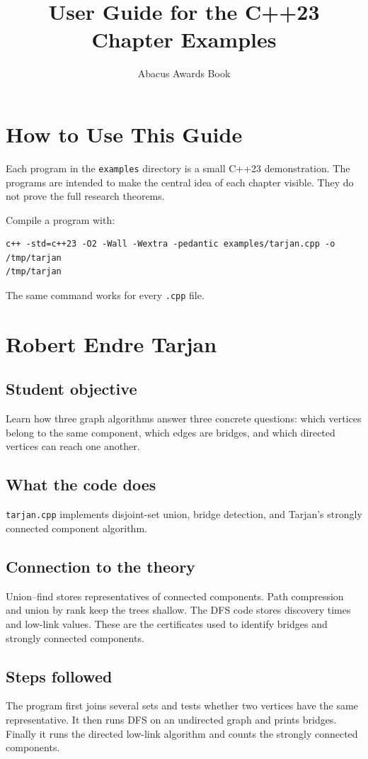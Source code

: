\documentclass[11pt]{book}
\title{User Guide for the C++23 Chapter Examples}
\author{Abacus Awards Book}
\begin{document}
\maketitle
\tableofcontents

\chapter*{How to Use This Guide}
Each program in the \texttt{examples} directory is a small C++23 demonstration.
The programs are intended to make the central idea of each chapter visible.
They do not prove the full research theorems.

Compile a program with:
\begin{verbatim}
c++ -std=c++23 -O2 -Wall -Wextra -pedantic examples/tarjan.cpp -o /tmp/tarjan
/tmp/tarjan
\end{verbatim}

The same command works for every \texttt{.cpp} file.

\chapter{Robert Endre Tarjan}
\section{Student objective}
Learn how three graph algorithms answer three concrete questions: which vertices belong to the same component, which edges are bridges, and which directed vertices can reach one another.
\section{What the code does}
\texttt{tarjan.cpp} implements disjoint-set union, bridge detection, and Tarjan's strongly connected component algorithm.

\section{Connection to the theory}
Union--find stores representatives of connected components. Path compression and union by rank keep the trees shallow. The DFS code stores discovery times and low-link values. These are the certificates used to identify bridges and strongly connected components.

\section{Steps followed}
The program first joins several sets and tests whether two vertices have the same representative. It then runs DFS on an undirected graph and prints bridges. Finally it runs the directed low-link algorithm and counts the strongly connected components.
\end{document}
